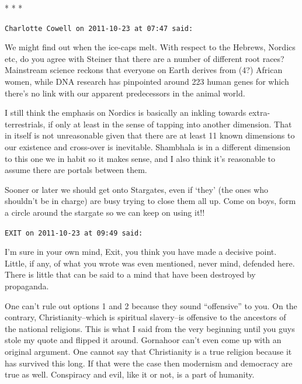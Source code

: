 
\begin{center}* * *\end{center}

\begin{footnotesize}
\begin{sffamily}
\texttt{Charlotte Cowell on 2011-10-23 at 07:47 said:}

We might find out when the ice-caps melt. With respect to the Hebrews, Nordics etc, do you agree with Steiner that there are a number of different root races? Mainstream science reckons that everyone on Earth derives from (4?) African women, while DNA research has pinpointed around 223 human genes for which there's no link with our apparent predecessors in the animal world.

I still think the emphasis on Nordics is basically an inkling towards extra-terrestrials, if only at least in the sense of tapping into another dimension. That in itself is not unreasonable given that there are at least 11 known dimensions to our existence and cross-over is inevitable. Shambhala is in a different dimension to this one we in habit so it makes sense, and I also think it's reasonable to assume there are portals between them.

Sooner or later we should get onto Stargates, even if `they' (the ones who shouldn't be in charge) are busy trying to close them all up. Come on boys, form a circle around the stargate so we can keep on using it!!

\hfill

\texttt{EXIT on 2011-10-23 at 09:49 said:} 

I'm sure in your own mind, Exit, you think you have made a decisive point. Little, if any, of what you wrote was even mentioned, never mind, defended here. There is little that can be said to a mind that have been destroyed by propaganda. 

One can't rule out options 1 and 2 because they sound ``offensive'' to you. On the contrary, Christianity--which is spiritual slavery--is offensive to the ancestors of the national religions. This is what I said from the very beginning until you guys stole my quote and flipped it around. Gornahoor can't even come up with an original argument. One cannot say that Christianity is a true religion because it has survived this long. If that were the case then modernism and democracy are true as well. Conspiracy and evil, like it or not, is a part of humanity.


\end{sffamily}
\end{footnotesize}
